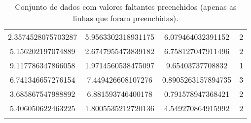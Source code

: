 \begin{longtable}{|c|c|c|c|}
        2.3574528075703287 & 5.9563302318931175 & 6.079464032391152 & 2 \\
        5.156202197074889 & 2.6747955473839182 & 6.758127047911496 & 2 \\
        9.117786347866058 & 1.9714560538475097 & 9.65403737708832 & 1 \\
        6.741346657276154 & 7.449426608107276 & 0.8905263157894735 & 3 \\
        3.685867547988892 & 6.881593746400178 & 0.791578947368421 & 2 \\
        5.406050622463225 & 1.8005535212720136 & 4.549270864915992 & 2 \\
        \hline
        \caption{Conjunto de dados com valores faltantes preenchidos (apenas as linhas que foram preenchidas).}
        \label{tab:linhas_preenchidas}
\end{longtable}

